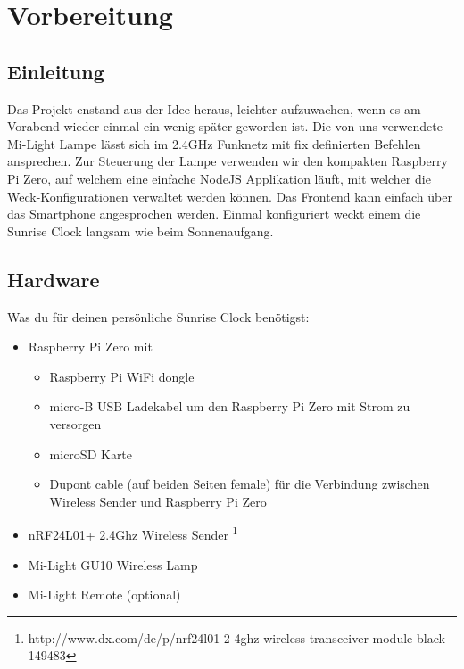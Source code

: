 

\newcommand{\SUBJECT}{Dokumentation}
\newcommand{\TITLE}{Sunrise Clock}



\section{Vorbereitung}

\subsection{Einleitung}
Das Projekt enstand aus der Idee heraus, leichter aufzuwachen, wenn es am Vorabend wieder einmal ein wenig später geworden ist. Die von uns verwendete Mi-Light Lampe lässt sich im 2.4GHz Funknetz mit fix definierten Befehlen ansprechen. Zur Steuerung der Lampe verwenden wir den kompakten Raspberry Pi Zero, auf welchem eine einfache NodeJS Applikation läuft, mit welcher die Weck-Konfigurationen verwaltet werden können. Das Frontend kann einfach über das Smartphone angesprochen werden. Einmal konfiguriert weckt einem die Sunrise Clock langsam wie beim Sonnenaufgang.

\subsection{Hardware}
Was du für deinen persönliche Sunrise Clock benötigst:
\begin{itemize}
	\item Raspberry Pi Zero mit 
	\begin{itemize}
		\item Raspberry Pi WiFi dongle
		\item micro-B USB Ladekabel um den Raspberry Pi Zero mit Strom zu versorgen
		\item microSD Karte
		\item Dupont cable (auf beiden Seiten female) für die Verbindung zwischen Wireless Sender und Raspberry Pi Zero
	\end{itemize}
	\item nRF24L01+ 2.4Ghz Wireless Sender \footnote{http://www.dx.com/de/p/nrf24l01-2-4ghz-wireless-transceiver-module-black-149483}
	\item Mi-Light GU10 Wireless Lamp 
	\item Mi-Light Remote (optional)
\end{itemize}

